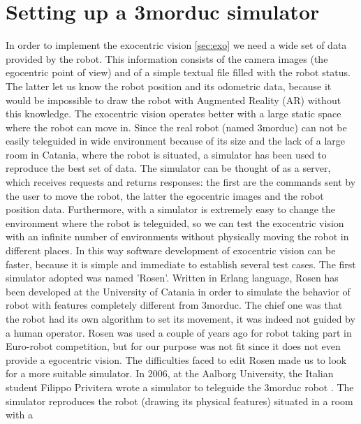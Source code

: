 \section{Setting up a 3morduc simulator}
\label{sec:simulator}

In order to implement the exocentric vision \ref{sec:exo} we need a wide set of data provided by the robot.
This information consists of the camera images (the egocentric point of view) and of a simple textual file filled with 
the robot status. The latter let us know the robot position and its odometric data, because it would be impossible to draw 
the robot with Augmented Reality (AR) without this knowledge.
\newline The exocentric vision operates better with a large static space where the robot can move in. Since the real robot 
(named 3morduc) can not be easily teleguided in wide environment because of its size and the lack of a large room in Catania, 
where the robot is situated, a simulator has been used to reproduce the best set of data. The simulator can be thought of as 
a server, which receives requests and returns responses: the first are the commands sent by the user to move the robot, the
latter the egocentric images and the robot position data.
\newline Furthermore, with a simulator is extremely easy to change the environment where the robot is teleguided, so we can test
the exocentric vision with an infinite number of environments without physically moving the robot in different places. In this way
software development of exocentric vision can be faster, because it is simple and immediate to establish several test cases.
\newline The first simulator adopted was named 'Rosen'. Written in Erlang language, Rosen has been developed at the University
of Catania in order to simulate the behavior of robot with features completely different from 3morduc. The chief one was that
the robot had its own algorithm to set its movement, it was indeed not guided by a human operator.
\newline Rosen was used a couple of years ago for robot taking part in Euro-robot competition, but for our purpose was not fit
since it does not even provide a egocentric vision. The difficulties faced to edit Rosen made us to look for a more suitable
simulator.
\newline In 2006, at the Aalborg University, the Italian student Filippo Privitera wrote a simulator to teleguide the
3morduc robot \cite{privitera}. The simulator reproduces the robot (drawing its physical features) situated in a room with a
